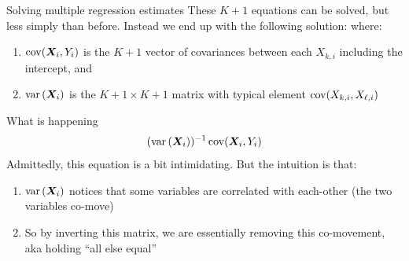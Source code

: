 \documentclass[aspectratio=169,t,11pt,table]{beamer}
\begin{document}
\begin{frame}{Solving multiple regression estimates}
  These $K + 1$ equations can be solved, but less simply than before. Instead we end up with the following solution:
  where:
  \begin{enumerate}
    \item $\cov(\bm{X}_i, Y_i)$ is the $K + 1$ vector of covariances between each $X_{k,i}$ including the intercept, and 
    \item $\var{\bm{X}_i}$ is the $K+1 \times K+1$ matrix with typical element $\cov(X_{k,i}, X_{\ell, i})$
  \end{enumerate}
\end{frame}

\begin{frame}{What is happening}
  \vspace*{-\bigskipamount}
  $$
    (\var{\bm{X}_i})^{-1} \cov(\bm{X}_i, Y_i)
  $$
  Admittedly, this equation is a bit intimidating. But the intuition is that:
  \begin{enumerate}
    \item $\var{\bm{X}_i}$ notices that some variables are correlated with each-other (the two variables co-move)
    \item So by inverting this matrix, we are essentially removing this co-movement, aka holding ``all else equal''
  \end{enumerate} 
\end{frame}
\end{document}
